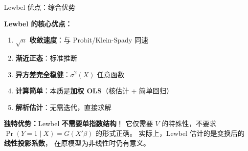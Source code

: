 \documentclass[aspectratio=169, 10pt]{beamer}
\begin{document}
\begin{frame}{Lewbel 优点：综合优势}

  \begin{highlightbox}
    \textbf{Lewbel 的核心优点：}
    \begin{enumerate}\setlength{\itemsep}{1pt}
      \item \textbf{$\sqrt{n}$ 收敛速度}：与 Probit/Klein-Spady 同速
      \item \textbf{渐近正态}：标准推断
      \item \textbf{异方差完全稳健}：$\sigma^2(X)$ 任意函数
      \item \textbf{计算简单}：本质是\textbf{加权 OLS}（核估计 + 简单回归）
      \item \textbf{解析估计}：无需迭代，直接求解
    \end{enumerate}
  \end{highlightbox}

  \begin{keybox}
    \textbf{独特优势：}Lewbel \textbf{不需要单指数结构}！
    它仅需要 $V$ 的特殊性，不要求 $\Pr(Y=1\mid X) = G(X'\beta)$ 的形式正确。
    实际上，Lewbel 估计的是变换后的\textbf{线性投影系数}，
    在原模型为非线性时仍有意义。
  \end{keybox}

  \hypertarget{main-c18}{}
  \hfill{\scriptsize\hyperlink{proof-c18}{}}

\end{frame}
\end{document}

